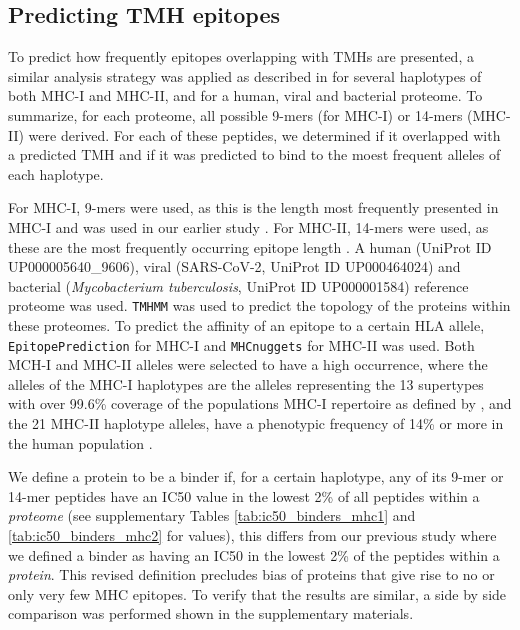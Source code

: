 \subsection{Predicting TMH epitopes}

To predict how frequently epitopes overlapping with TMHs are presented,
a similar analysis strategy was applied as described in \cite{bianchi2017} 
for several haplotypes of both MHC-I and MHC-II, 
and for a human, viral and bacterial proteome.
To summarize, for each proteome, 
all possible 9-mers (for MHC-I) or 14-mers (MHC-II) were derived. 
For each of these peptides, we determined if it overlapped with a predicted 
TMH and if it was predicted to bind to the moest frequent alleles of each haplotype.

For MHC-I, 9-mers were used, 
as this is the length most frequently presented in MHC-I 
and was used in our earlier study \cite{bianchi2017}. 
For MHC-II, 14-mers were used, 
as these are the most frequently occurring epitope length \cite{bergseng2015different}.
A human (UniProt ID UP000005640\_9606), 
viral (SARS-CoV-2, UniProt ID UP000464024) 
and bacterial (\emph{Mycobacterium tuberculosis}, UniProt ID UP000001584) 
reference proteome was used. 
\verb;TMHMM; \cite{krogh2001predicting} was used to predict the topology 
of the proteins within these proteomes.
To predict the affinity of an epitope to a certain HLA allele,
 \verb;EpitopePrediction; \cite{bianchi2017} for MHC-I 
and \verb;MHCnuggets; \cite{shao2020high} for MHC-II was used.
Both MCH-I and MHC-II alleles were selected to have a high occurrence,
where the alleles of the MHC-I haplotypes are the alleles representing the 13 supertypes 
with over 99.6\% coverage of the populations MHC-I repertoire as defined by \cite{lund2004definition} \cite{sette1999},
and the 21 MHC-II haplotype alleles, have a phenotypic frequency 
of 14\% or more in the human population \cite{greenbaum2011functional}.
 
We define a protein to be a binder if, for a certain haplotype, 
any of its 9-mer or 14-mer peptides have an IC50 value in the lowest 2\% of 
all peptides within a \emph{proteome} 
(see supplementary Tables \ref{tab:ic50_binders_mhc1} and \ref{tab:ic50_binders_mhc2} for values), 
this differs from our previous study where we defined
a binder as having an IC50 in the lowest 2\% 
of the peptides within a \emph{protein}.
This revised definition precludes bias of proteins 
that give rise to no or only very few MHC epitopes.
To verify that the results are similar, a side by side comparison was performed shown in the supplementary materials.

